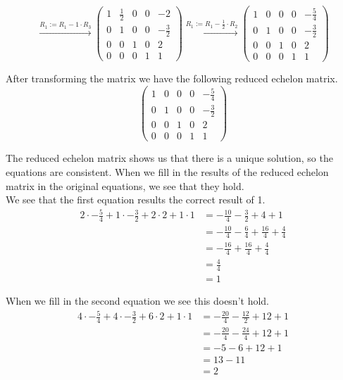 \documentclass[a4paper]{article}
\begin{document}
\[
\xrightarrow{\text{$R_1 := R_1 - 1 \cdot R_3$}}
\left(
\begin{array}{cccc|c}
1 & \frac{1}{2} & 0 & 0 & -2  \\
0 & 1 & 0 & 0 & - \frac{3}{2}  \\
0 & 0 & 1 & 0 & 2  \\
0 & 0 & 0 & 1 & 1
\end{array}
\right)
\xrightarrow{\text{$R_1 := R_1 - \frac{1}{2} \cdot R_2$}}
\left(
\begin{array}{cccc|c}
1 & 0 & 0 & 0 & - \frac{5}{4}  \\
0 & 1 & 0 & 0 & - \frac{3}{2}  \\
0 & 0 & 1 & 0 & 2  \\
0 & 0 & 0 & 1 & 1
\end{array}
\right)
\]

After transforming the matrix we have the following reduced echelon matrix.
\[
\left(
\begin{array}{cccc|c}
1 & 0 & 0 & 0 & - \frac{5}{4}  \\
0 & 1 & 0 & 0 & - \frac{3}{2}  \\
0 & 0 & 1 & 0 & 2  \\
0 & 0 & 0 & 1 & 1
\end{array}
\right)
\]

The reduced echelon matrix shows us that there is a unique solution, so the equations are consistent. When we fill in the results of the reduced echelon matrix in the original equations, we see that they hold.\\
We see that the first equation results the correct result of 1.
\begin{align*}
2 \cdot - \frac{5}{4} + 1 \cdot - \frac{3}{2} + 2 \cdot 2 + 1 \cdot 1
&= - \frac{10}{4} - \frac{3}{2} + 4 + 1 \\
&= - \frac{10}{4} - \frac{6}{4} + \frac{16}{4} + \frac{4}{4} \\
&= - \frac{16}{4} + \frac{16}{4} + \frac{4}{4} \\
&= \frac{4}{4} \\
&= 1
\end{align*}

When we fill in the second equation we see this doesn't hold.
\begin{align*}
4 \cdot - \frac{5}{4} + 4 \cdot - \frac{3}{2} + 6 \cdot 2 + 1 \cdot 1
&= - \frac{20}{4} - \frac{12}{2} + 12 + 1 \\
&= - \frac{20}{4} - \frac{24}{4} + 12 + 1 \\
&= - 5 - 6 + 12 + 1 \\
&= 13 -11 \\
&= 2
\end{align*}
\end{document}
